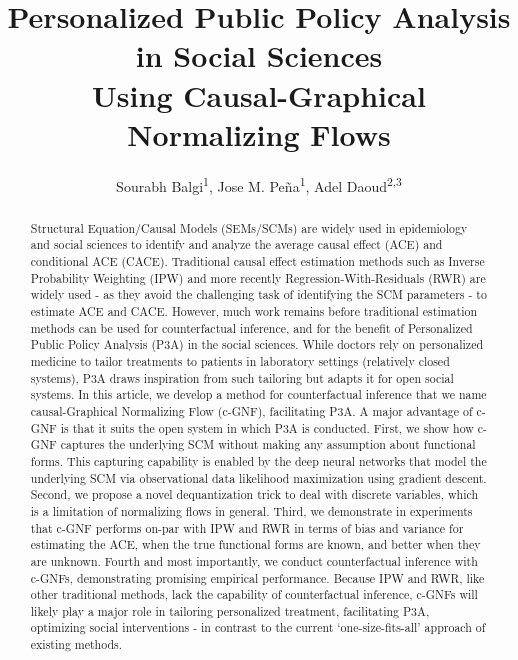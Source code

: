 \documentclass[letterpaper]{article} %
\title{Personalized Public Policy Analysis in Social Sciences\\Using Causal-Graphical Normalizing Flows}
\author {
    Sourabh Balgi\textsuperscript{\rm 1},
    Jose M. Pe{\~n}a\textsuperscript{\rm 1},
    Adel Daoud\textsuperscript{\rm 2,}\textsuperscript{\rm 3} \\
}
\begin{document}
\maketitle


\begin{abstract}







Structural Equation/Causal Models (SEMs/SCMs) are widely used in epidemiology and social sciences to identify and analyze the average causal effect (ACE) and conditional ACE (CACE). Traditional causal effect estimation methods such as Inverse Probability Weighting (IPW) and more recently Regression-With-Residuals (RWR) are widely used - as they avoid the challenging task of identifying the SCM parameters - to estimate ACE and CACE. However, much work remains before traditional estimation methods can be used for counterfactual inference, and for the benefit of Personalized Public Policy Analysis (P3A) in the social sciences. While doctors rely on personalized medicine to tailor treatments to patients in laboratory settings (relatively closed systems), P3A draws inspiration from such tailoring but adapts it for open social systems. In this article, we develop a method for counterfactual inference that we name causal-Graphical Normalizing Flow (c-GNF), facilitating P3A. A major advantage of c-GNF is that it suits the open system in which P3A is conducted. First, we show how c-GNF captures the underlying SCM without making any assumption about functional forms. This capturing capability is enabled by the deep neural networks that model the underlying SCM via observational data likelihood maximization using gradient descent. Second, we propose a novel dequantization trick to deal with discrete variables, which is a limitation of normalizing flows in general. Third, we demonstrate in experiments that c-GNF performs on-par with IPW and RWR in terms of bias and variance for estimating the ACE, when the true functional forms are known, and better when they are unknown. Fourth and most importantly, we conduct counterfactual inference with c-GNFs, demonstrating promising empirical performance. Because IPW and RWR, like other traditional methods, lack the capability of counterfactual inference, c-GNFs will likely play a major role in tailoring personalized  treatment, facilitating P3A, optimizing social interventions - in contrast to the current `one-size-fits-all' approach of existing methods.
\end{abstract}
\end{document}
